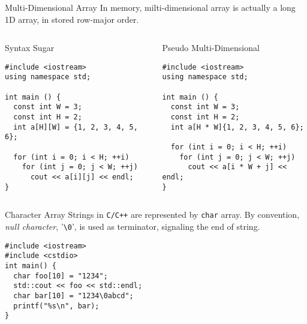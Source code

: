 \documentclass[presentation]{beamer}
\begin{document}
\begin{frame}[fragile,label={sec:orgheadline26}]{Multi-Dimensional Array}
 In memory, milti-dimensional array is actually a long 1D array, in
stored row-major order.

\begin{columns}
\begin{column}{0.5\columnwidth}
\begin{block}{Syntax Sugar}
\begin{verbatim}
#include <iostream>
using namespace std;

int main () {
  const int W = 3;
  const int H = 2;
  int a[H][W] = {1, 2, 3, 4, 5, 6};

  for (int i = 0; i < H; ++i)
    for (int j = 0; j < W; ++j)
      cout << a[i][j] << endl;
}
\end{verbatim}
\end{block}
\end{column}

\begin{column}{0.5\columnwidth}
\begin{block}{Pseudo Multi-Dimensional}
\begin{verbatim}
#include <iostream>
using namespace std;

int main () {
  const int W = 3;
  const int H = 2;
  int a[H * W]{1, 2, 3, 4, 5, 6};

  for (int i = 0; i < H; ++i)
    for (int j = 0; j < W; ++j)
      cout << a[i * W + j] << endl;
}
\end{verbatim}
\end{block}
\end{column}
\end{columns}
\end{frame}

\begin{frame}[fragile,label={sec:orgheadline27}]{Character Array}
 Strings in \texttt{C/C++} are represented by \texttt{char} array.  By convention,
\emph{null character}, '\texttt{\textbackslash{}0}', is used as terminator, signaling the end
of string.

\begin{verbatim}
#include <iostream>
#include <cstdio>
int main() {
  char foo[10] = "1234";
  std::cout << foo << std::endl;
  char bar[10] = "1234\0abcd";
  printf("%s\n", bar);
}
\end{verbatim}
\end{frame}
\end{document}
